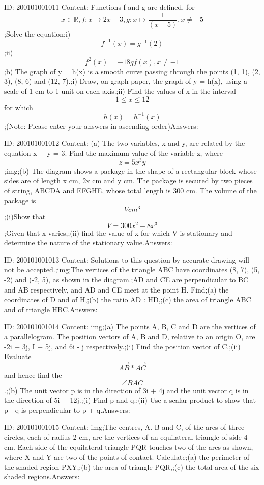 \documentclass{article}
\begin{document}
ID: 200101001011
Content:
Functions f and g are defined, for \[x\in \mathbb{R},f:x \mapsto 2x-3,g:x \mapsto\frac{1}{(x+5)},x\neq-5\] ;Solve the equation;i) \[f^{-1}(x)=g^{-1}(2)\] ;ii) \[f^2(x)=-18gf(x),x\neq-1\] ;b) The graph of y = h(x) is a smooth curve passing through the points (1, 1), (2, 3), (8, 6) and (12, 7).;i) Draw, on graph paper, the graph of y = h(x), using a scale of 1 cm to 1 unit on each axis.;ii) Find the values of x in the interval \[1\leq x\leq 12\] for which \[h(x)=h^{-1}(x)\];(Note: Please enter your answers in ascending order)Answers:

ID: 200101001012
Content:
(a)	The two variables, x and y, are related by the equation x + y = 3. Find the maximum value of the variable z, where \[z=5x^3y\];img;(b) The diagram shows a package in the shape of a rectangular block whose sides are of length x cm, 2x cm and y cm. The package is secured by two pieces of string, ABCDA and EFGHE, whose total length is 300 cm. The volume of the package is \[V cm^3\];(i)Show that \[V=300x^2-8x^3\];Given that x varies,;(ii)	find the value of x for which V is stationary and determine the nature of the stationary value.Answers:

ID: 200101001013
Content:
Solutions to this question by accurate drawing will not be accepted.;img;The vertices of the triangle ABC have coordinates (8, 7), (5, -2) and (-2, 5), as shown in the diagram.;AD and CE are perpendicular to BC and AB respectively, and AD and CE meet at the point H. Find;(a) the coordinates of D and of H,;(b)  the ratio AD : HD,;(c) the area of triangle ABC and of triangle HBC.Answers:

ID: 200101001014
Content:
img;(a)	The points A, B, C and D are the vertices of a parallelogram. The position vectors of A, B and D, relative to an origin O, are -2i + 3j, I + 5j, and 6i - j respectively.;(i)	Find the position vector of C.;(ii)	Evaluate \[\vec{AB}\ast \vec{AC}\] and hence find the \[\angle BAC\].;(b) The unit vector p is in the direction of 3i + 4j and the unit vector q is in the direction of 5i + 12j.;(i)	Find p and q.;(ii)	Use a scalar product to show that p - q is perpendicular to p + q.Answers:

ID: 200101001015
Content:
img;The centres, A. B and C, of the arcs of three circles, each of radius 2 cm, are the vertices of an equilateral triangle of side 4 cm. Each side of the equilateral triangle PQR touches two of the arcs as shown, where X and Y are two of the points of contact. Calculate;(a)	the perimeter of the shaded region PXY,;(b)	the area of triangle PQR,;(c)	the total area of the six shaded regions.Answers:
\end{document}
